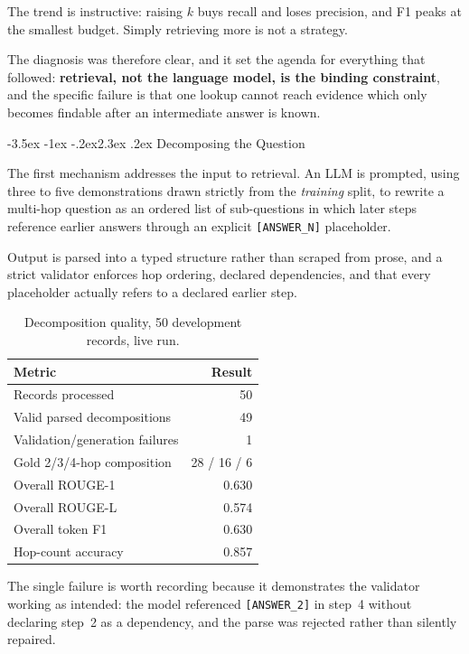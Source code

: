 \documentclass[11pt,a4paper]{article}
\makeatletter
\renewcommand\section{\@startsection{section}{1}{\z@}%
  {-3.5ex \@plus -1ex \@minus -.2ex}{2.3ex \@plus.2ex}%
  {\color{ink}\normalfont\Large\bfseries}}
\newcommand{\code}[1]{\texttt{\small #1}}
\makeatother
\begin{document}
The trend is instructive: raising $k$ buys recall and loses precision, and F1
peaks at the smallest budget. Simply retrieving more is not a strategy.

The diagnosis was therefore clear, and it set the agenda for everything that
followed: \textbf{retrieval, not the language model, is the binding constraint},
and the specific failure is that one lookup cannot reach evidence which only
becomes findable after an intermediate answer is known.

\section{Decomposing the Question}

The first mechanism addresses the input to retrieval. An LLM is prompted, using
three to five demonstrations drawn strictly from the \emph{training} split, to
rewrite a multi-hop question as an ordered list of sub-questions in which later
steps reference earlier answers through an explicit \code{[ANSWER\_N]}
placeholder.

Output is parsed into a typed structure rather than scraped from prose, and a
strict validator enforces hop ordering, declared dependencies, and that every
placeholder actually refers to a declared earlier step.

\begin{table}[H]
\centering
\caption{Decomposition quality, 50 development records, live run.}
\begin{tabular}{lr}
\toprule
\textbf{Metric} & \textbf{Result} \\
\midrule
Records processed                 & 50 \\
Valid parsed decompositions       & 49 \\
Validation/generation failures    & 1 \\
Gold 2/3/4-hop composition        & 28 / 16 / 6 \\
Overall ROUGE-1                   & 0.630 \\
Overall ROUGE-L                   & 0.574 \\
Overall token F1                  & 0.630 \\
Hop-count accuracy                & 0.857 \\
\bottomrule
\end{tabular}
\end{table}

The single failure is worth recording because it demonstrates the validator
working as intended: the model referenced \code{[ANSWER\_2]} in step~4 without
declaring step~2 as a dependency, and the parse was rejected rather than
silently repaired.
\end{document}
